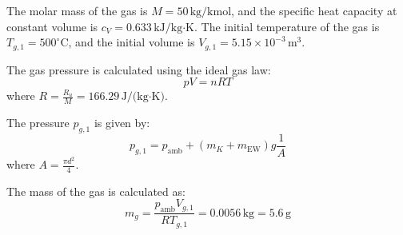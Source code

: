 The molar mass of the gas is \( M = 50 \, \text{kg/kmol} \), and the specific heat capacity at constant volume is \( c_V = 0.633 \, \text{kJ/kg·K} \). The initial temperature of the gas is \( T_{g,1} = 500^\circ\text{C} \), and the initial volume is \( V_{g,1} = 5.15 \times 10^{-3} \, \text{m}^3 \).  

The gas pressure is calculated using the ideal gas law:  
\[
p V = n R T
\]  
where \( R = \frac{R_u}{M} = 166.29 \, \text{J/(kg·K)} \).  

The pressure \( p_{g,1} \) is given by:  
\[
p_{g,1} = p_{\text{amb}} + \left( m_K + m_{\text{EW}} \right) g \frac{1}{A}
\]  
where \( A = \frac{\pi d^2}{4} \).  

The mass of the gas is calculated as:  
\[
m_g = \frac{p_{\text{amb}} V_{g,1}}{R T_{g,1}} = 0.0056 \, \text{kg} = 5.6 \, \text{g}
\]